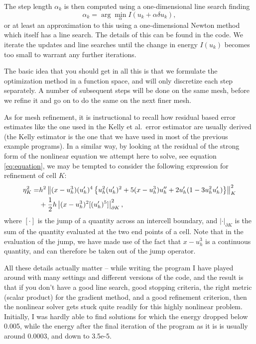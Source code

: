\documentclass{article}
\begin{document}
The step length $\alpha_k$ is then computed using a one-dimensional line search
finding
\begin{equation}
  \label{eq:linesearch}
  \alpha_k = \arg\min_\alpha I(u_k+\alpha\delta u_k),
\end{equation}
or at least an approximation to this using a one-dimensional Newton method
which itself has a line search. The details of this can be found in the code.
We iterate the updates and line searches until the change in energy $I(u_k)$
becomes too small to warrant any further iterations.

The basic idea that you should get in all this is that we formulate the
optimization method in a function space, and will only discretize each step
separately. A number of subsequent steps will be done on the same mesh, before
we refine it and go on to do the same on the next finer mesh.

As for mesh refinement, it is instructional to recall how residual based error
estimates like the one used in the Kelly et al.~error estimator are usually
derived (the Kelly estimator is the one that we have used in most of the
previous example programs). In a similar way, by looking at the residual of
the strong form of the nonlinear equation we attempt here to solve, see
equation \eqref{eq:equation}, we may be tempted to consider the following
expression for refinement of cell $K$:
\begin{eqnarray}
  \label{eq:error-estimate}
  \eta_K^2 =&
  h^2 \left\|
    (x-u_h^3) (u_h')^4 \left\{ u_h^2 (u_h')^2 + 5(x-u_h^3)u_h'' + 2u_h'(1-3u_h^2u_h') \right\}
  \right\|^2_K
  \notag \\
  & +
  \frac 12 h \left| (x-u_h^3)^2 [(u_h')^5] \right|^2_{\partial K},
\end{eqnarray}
where $[\cdot]$ is the jump of a quantity across an intercell boundary, and 
$|\cdot|_{\partial K}$ is the sum of the quantity evaluated at the two end
points of a cell. Note that in the evaluation of the jump, we have made use of
the fact that $x-u_h^3$ is a continuous quantity, and can therefore be taken
out of the jump operator.

All these details actually matter -- while writing the program I have played
around with many settings and different versions of the code, and the result
is that if you don't have a good line search, good stopping criteria, the
right metric (scalar product) for the gradient method, and a good refinement
criterion, then the nonlinear solver gets stuck quite readily for this highly
nonlinear problem. Initially, I was hardly able to find solutions for which
the energy dropped below 0.005, while the energy after the final iteration of
the program as it is is usually around 0.0003, and down to 3.5e-5.
\end{document}
